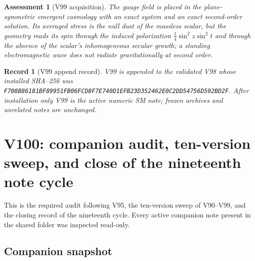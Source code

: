 \documentclass[11pt]{article}
\newtheorem{assessment}[theorem]{Assessment}
\newtheorem{record}[theorem]{Record}
\theoremstyle{remark}
\begin{document}
\begin{assessment}[V99 acquisition]
\label{ass:v19v99}
The gauge field is placed in the plane-symmetric emergent cosmology
with an exact system and an exact second-order solution.  Its
averaged stress is the null dust of the massless scalar, but the
geometry reads its spin through the induced polarization
\(\tfrac14\sin^2z\sin^2t\) and through the absence of the scalar's
inhomogeneous secular growth; a standing electromagnetic wave does
not radiate gravitationally at second order.
\end{assessment}

\begin{record}[V99 append record]
\label{rec:v19v99}
V99 is appended to the validated V98 whose installed SHA--256 was
\texttt{F708B86181BF89951FB06FCD8F7E740D1EFB23D352462E0C2DD54756D592BD2F}.
After installation only V99 is the active numeric SM note; frozen
archives and unrelated notes are unchanged.
\end{record}


\section{V100: companion audit, ten-version sweep, and close of the nineteenth note cycle}
\label{sec:v19v100}

This is the required audit following V95, the ten-version sweep of
V90--V99, and the closing record of the nineteenth cycle.  Every
active companion note present in the shared folder was inspected
read-only.

\subsection{Companion snapshot}
\end{document}

